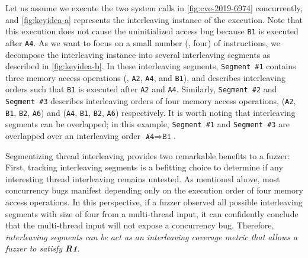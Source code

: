 %
Let us assume we execute the two system calls in
\autoref{fig:cve-2019-6974} concurrently, and \autoref{fig:keyidea-a}
represents the interleaving instance of the execution. Note that this
execution does not cause the uninitialized access bug because
\texttt{B1} is executed after \texttt{A4}.
%
As we want to focus on a small number (\eg, four) of instructions, we
decompose the interleaving instance into several interleaving segments
as described in \autoref{fig:keyidea-b}.
%
In these interleaving segments, \texttt{Segment \#1} contains three
memory access operations (\ie, \texttt{A2}, \texttt{A4}, and
\texttt{B1}), and describes interleaving orders such that \texttt{B1}
is executed after \texttt{A2} and \texttt{A4}.
%
Similarly, \texttt{Segment \#2} and \texttt{Segment \#3} describes
interleaving orders of four memory access operations, (\texttt{A2},
\texttt{B1}, \texttt{B2}, \texttt{A6}) and (\texttt{A4}, \texttt{B1},
\texttt{B2}, \texttt{A6}) respectively.
%
It is worth noting that interleaving segments can be overlapped; in
this example, \texttt{Segment \#1} and \texttt{Segment \#3} are
overlapped over an interleaving order
$\texttt{A4} \Rightarrow \texttt{B1}$.




%
Segmentizing thread interleaving provides two remarkable benefits to a
fuzzer:
%
First, tracking interleaving segments is a befitting choice to
determine if any interesting thread interleaving remains untested.
%
As mentioned above, most concurrency bugs manifest depending only on
the execution order of four memory access operations.
%
In this perspective, if a fuzzer observed all possible interleaving
segments with size of four from a multi-thread input, it can
confidently conclude that the multi-thread input will not expose a
concurrency bug.
%
Therefore, \textit{interleaving segments can be act as an interleaving
  coverage metric that allows a fuzzer to satisfy \textbf{R1}}.



